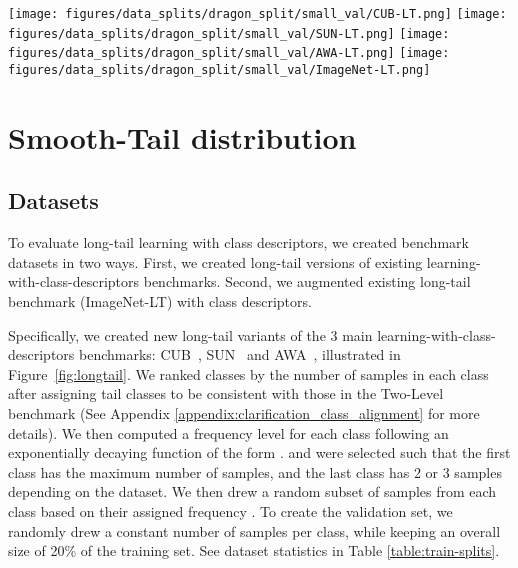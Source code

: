 \documentclass[10pt,twocolumn,letterpaper]{article}
\newcommand{\figref}[1]{Figure~\ref{#1}}
\newcommand{\SmoothTail}{Smooth-Tail}
\newcommand{\TwoLevel}{Two-Level}
\begin{document}
\begin{figure*}[t!]
    \centering
    \texttt{[image: figures/data\_splits/dragon\_split/small\_val/CUB-LT.png]}
    \texttt{[image: figures/data\_splits/dragon\_split/small\_val/SUN-LT.png]}
    \texttt{[image: figures/data\_splits/dragon\_split/small\_val/AWA-LT.png]}
    \texttt{[image: figures/data\_splits/dragon\_split/small\_val/ImageNet-LT.png]}
    \caption{Long-tailed versions of CUB, SUN, AWA and ImageNet. Number of samples for the training, validation and test sets are shown respectively by blue, yellow and green. }\label{fig:longtail}
\end{figure*}


\section{\SmoothTail{} distribution} 
\label{sec:smooth-tail}
\subsection{Datasets}
To evaluate long-tail learning with class descriptors, we created benchmark datasets in two ways. First, we created long-tail versions of existing learning-with-class-descriptors benchmarks. Second, we augmented existing long-tail benchmark (ImageNet-LT) with class descriptors. 

Specifically, we created new long-tail variants of the 3 main learning-with-class-descriptors benchmarks: CUB~\cite{CUB}, SUN~\cite{SUN} and AWA~\cite{DAP}, illustrated in \figref{fig:longtail}.
We ranked classes by the number of samples in each class after assigning tail classes to be consistent with those in the \TwoLevel{} benchmark \cite{xian_2018, Schnfeld2019GeneralizedZL} (See Appendix \ref{appendix:clarification_class_alignment} for more details). We then computed a frequency level for each class following an exponentially decaying function of the form  .  and  were selected such that the first class has the maximum number of samples, and the last class has 2 or 3 samples depending on the dataset. We then drew a random subset of samples from each class based on their assigned frequency . To create the validation set, we randomly drew a constant number of samples per class, while keeping an overall size of 20\% of the training set. 
See dataset statistics in Table \ref{table:train-splits}.
\end{document}
